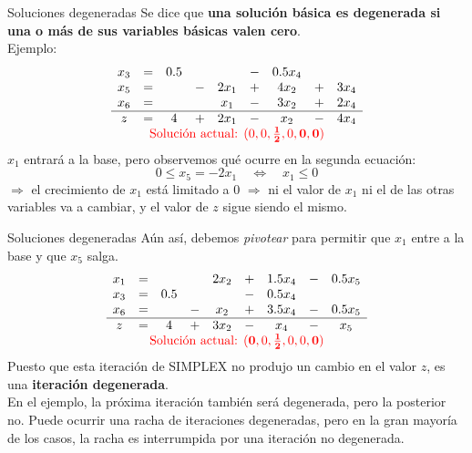 \documentclass[10pt, aspectratio=169]{beamer}
\begin{document}
\begin{frame}{Soluciones degeneradas}
    Se dice que \textbf{una solución básica es degenerada si una o más de sus variables básicas valen cero}.\\
    Ejemplo:
    \[
        \begin{array}{ccccccccc}
            x_3 & = & 0.5 &   &      & - & 0.5x_4 &   &      \\
            x_5 & = &     & - & 2x_1 & + & 4x_2   & + & 3x_4 \\
            x_6 & = &     &   & x_1  & - & 3x_2   & + & 2x_4 \\ \hline
            z   & = & 4   & + & 2x_1 & - & x_2    & - & 4x_4 \\
            \multicolumn{9}{c}
            {\text{\textcolor{red}{Solución actual: $(0,0,\mathbf{\frac{1}{2}},0,\mathbf{0},\mathbf{0})$}}}
        \end{array}
    \]
    $x_1$ entrará a la base, pero observemos qué ocurre en la segunda ecuación:
    \[ 0 \leq x_5 = -2x_1 \quad \Leftrightarrow \quad x_1 \leq 0\]
    $\Rightarrow$ el crecimiento de $x_1$ está limitado a 0
    $\Rightarrow$ ni el valor de $x_1$ ni el de las otras variables va a cambiar, y el valor de $z$
    sigue siendo el mismo.\\
\end{frame}

\begin{frame}{Soluciones degeneradas}
    Aún así, debemos \textit{pivotear} para permitir que $x_1$ entre a la base y que $x_5$ salga.
    \[
        \begin{array}{ccccccccc}
            x_1 & = &     &   & 2x_2 & + & 1.5x_4 & - & 0.5x_5 \\
            x_3 & = & 0.5 &   &      & - & 0.5x_4 &   &        \\
            x_6 & = &     & - & x_2  & + & 3.5x_4 & - & 0.5x_5 \\ \hline
            z   & = & 4   & + & 3x_2 & - & x_4    & - & x_5    \\
            \multicolumn{9}{c}
            {\text{\textcolor{red}{Solución actual: $(\mathbf{0},0,\mathbf{\frac{1}{2}},0,0,\mathbf{0})$}}}
        \end{array}
    \]
    Puesto que esta iteración de SIMPLEX no produjo un cambio en el valor $z$, es una \textbf{iteración degenerada}.\\
    \vskip 0.3cm
    En el ejemplo, la próxima iteración también será degenerada, pero la posterior no. Puede ocurrir una racha de
    iteraciones degeneradas, pero en la gran mayoría de los casos, la racha es interrumpida por una iteración no
    degenerada.
\end{frame}
\end{document}
